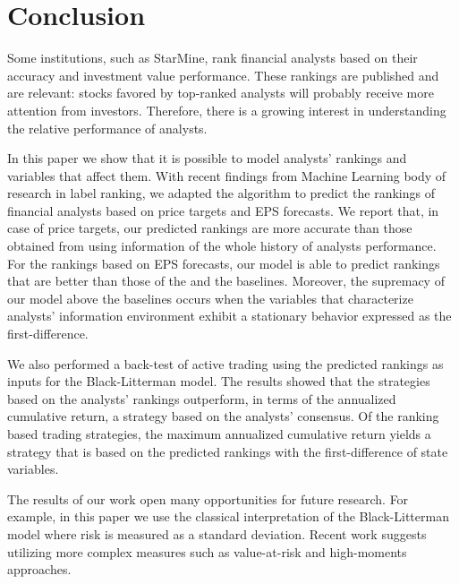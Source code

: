 \documentclass[a4paper,twoside,12pt,openright,notitlepage]{report}\usepackage[]{graphicx}\usepackage[]{color}
\begin{document}
\section{Conclusion}
\label{ch4-sec:conclusion}
Some institutions, such as StarMine, rank financial analysts based on their accuracy and investment value performance. These rankings are published and are relevant: stocks favored by top-ranked analysts will probably receive more attention from investors. Therefore, there is a growing interest in understanding the relative performance of analysts.

In this paper we show that it is possible to model analysts' rankings and variables that affect them. With recent findings from Machine Learning body of research in label ranking, we adapted the algorithm to predict the rankings of financial analysts based on price targets and EPS forecasts. We report that, in case of price targets,  our predicted rankings are more accurate than those obtained from using information of  the whole history of analysts performance. For the rankings based on EPS forecasts, our model is able to predict rankings that are better than those of the  and the \naive{} baselines. Moreover, the supremacy of our model above the baselines occurs when  the variables that characterize analysts' information environment exhibit a stationary behavior expressed as the first-difference.

We also performed a back-test of active trading using the predicted rankings as inputs for the Black-Litterman model. The results showed that the strategies based on the analysts' rankings outperform, in terms of the annualized cumulative return, a  strategy based on the analysts' consensus. Of the ranking based trading strategies, the maximum annualized cumulative return yields  a strategy that is based on the predicted rankings with the first-difference of state variables.

The results of our work open many opportunities for future research. For example, in this paper we use the classical interpretation of the Black-Litterman model where risk is measured as a standard deviation. Recent work suggests utilizing more complex measures such as value-at-risk and high-moments approaches.

\end{document}
